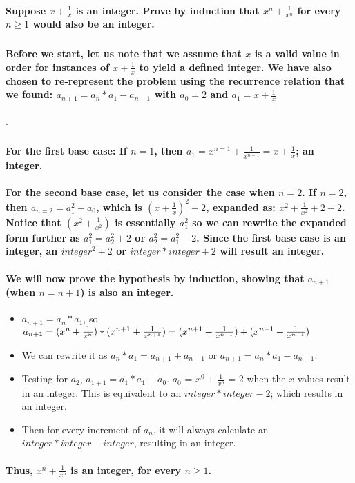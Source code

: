 \documentclass[letterpaper,12pt]{article}
\begin{document}
\paragraph{Suppose $x+\frac{1}{x}$ is an integer. Prove by induction that $x^n + \frac{1}{x^n}$ for every $n\geq1$ would also be an integer. }
\subparagraph{}
\paragraph{Before we start, let us note that we assume that $x$ is a valid value in order for instances of $x + \frac{1}{x}$ to yield a defined integer. We have also chosen to re-represent the problem using the recurrence relation that we found: $a_{n+1} = a_{n}*a_{1}-a_{n-1}$  with $a_{0}=2$ and $a_{1}=x+\frac{1}{x}$}. 
\subparagraph{}

\paragraph{For the first base case: If $n=1$, then $a_{1}=x^{n=1} + \frac{1}{x^{n=1}} = x + \frac{1}{x}$; an integer. }
\paragraph{For the second base case, let us consider the case when $n = 2$. If $n = 2$, then $a_{n=2}=a_{1}^2-a_{0}$, which is $(x+\frac{1}{x})^2-2$, expanded as: $x^2 + \frac{1}{x^2}+2-2$. Notice that $(x^2 + \frac{1}{x^2})$ is essentially $a_{1}^2$ so we can rewrite the expanded form further as $a_{1}^2 = a_{2}^2 + 2$ or $a_{2}^2 = a_{1}^2 - 2$. Since the first base case is an integer, an $integer^2 + 2$ or $integer * integer + 2$ will result an integer. }

\paragraph{We will now prove the hypothesis by induction, showing that $a_{n+1}$ (when $n=n+1$) is also an integer. }
\begin{itemize}
\item{$a_{n+1}=a_{n} * a_{1}$, so $a_{n+1}=(x^n + \frac{1}{x^n}) * (x^{n+1} + \frac{1}{x^{n+1}}) = \\\\(x^{n+1}+\frac{1}{x^{n+1}})+(x^{n-1}+\frac{1}{x^{n-1}})$}
\item{We can rewrite it as $a_{n} * a_{1} = a_{n+1} + a_{n-1}$ or $a_{n+1} = a_{n} * a_{1} - a_{n-1}$. }
\item{Testing for $a_{2}$, $a_{1+1} = a_{1}*a_{1}-a_{0}$. $a_{0}$ = $x^0 + \frac{1}{x^0}$ = 2 when the $x$ values result in an integer. This is equivalent to an $integer*integer-2$; which results in an integer. }
\item{Then for every increment of $a_{n}$, it will always calculate an $integer*integer-integer$, resulting in an integer. }
\end{itemize}
\paragraph{Thus, $x^n + \frac{1}{x^n}$ is an integer, for every $\textit{n}\geq1$. }
\end{document}
